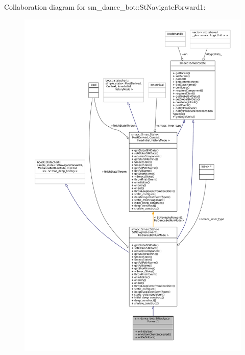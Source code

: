 Collaboration diagram for sm\+\_\+dance\+\_\+bot\+:\+:St\+Navigate\+Forward1\+:
\nopagebreak
\begin{figure}[H]
\begin{center}
\leavevmode
\includegraphics[width=350pt]{structsm__dance__bot_1_1StNavigateForward1__coll__graph}
\end{center}
\end{figure}
